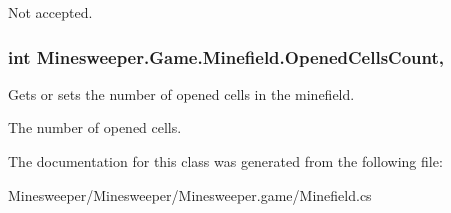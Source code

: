 Not accepted.\hypertarget{class_minesweeper_1_1_game_1_1_minefield_a3fabf570d9045ea288bb06fd1ecea287}{
\subsubsection[{Opened\+Cells\+Count}]{\setlength{\rightskip}{0pt plus 5cm}int Minesweeper.\+Game.\+Minefield.\+Opened\+Cells\+Count\hspace{0.3cm}{\ttfamily [get]}, {\ttfamily [set]}}}\label{class_minesweeper_1_1_game_1_1_minefield_a3fabf570d9045ea288bb06fd1ecea287}


Gets or sets the number of opened cells in the minefield. 

The number of opened cells.

The documentation for this class was generated from the following file\+:\begin{DoxyCompactItemize}
\item 
Minesweeper/\+Minesweeper/\+Minesweeper.\+game/Minefield.\+cs\end{DoxyCompactItemize}

